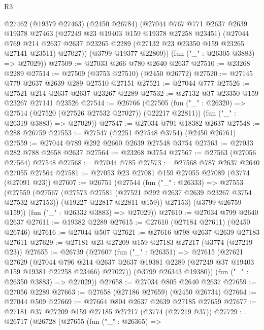 \begin{lexlean}{R3}
\begin{coremodule}
      @27462
        (@19379 @27463)
        (@2450 @26784)
        (@27044
          @767
          @771
          @2637
          @2639
          @19378
          @27463
          (@27249 @23 @19403 @159 @19378 @27258 @23451)
          (@27044
            @769
            @214
            @2637
            @2637
            @23265
            @2289
            (@27132 @23 @23350 @159 @23265 @27141 @23511)
            @27027))
        (@3799 @19377 @22809))
      (fun ("_" : @26305 @3883) => @27029))
@27509 := @27033 @266 @780 @2640 @2637
@27510 := @23268 @2289
@27514 := @27509 (@3753 @27510) (@2450 @26772)
@27520 := @27145 @779 @2637 @2639 @289 @27510 @27151
@27521 := @27044 @777
@27526 := @27521 @214 @2637 @2637 @23267 @2289
@27532 := @27132 @37 @23350 @159 @23267 @27141 @23526
@27544 := @26766
    (@27505
      (fun ("_" : @26320) => @27514 (@27520 (@27526 @27532 @27027)) (@22217 @22811))
      (fun ("_" : @26319 @3883) => @27029))
@27547 := @27034 @791 @18382 @2637
@27548 := @288 @26759
@27553 := @27547 (@2251 @27548 @3754) (@2450 @26761)
@27559 := @27044 @789 @292 @2660 @2639 @27548 @3754
@27563 := @27033 @282 @788 @2658 @2637
@27564 := @23268 @3754
@27567 := @27563 (@27056 @27564) @27548
@27568 := @27044 @785
@27573 := @27568 @787 @2637 @2640 @27055 @27564
@27581 := @27053 @23 @27081 @159 @27055 @27089 (@3774 (@27091 @23))
@27607 := @26751
    (@27544
      (fun ("_" : @26333) =>
      @27553
        (@27559
          (@27567
            (@27573 @27581 (@27521 @292 @2637 @2639 @23267 @3754 @27532 @27153))
            (@19227 @22817 @22811 @159))
          @27153)
        (@3799 @26759 @159))
      (fun ("_" : @26332 @3883) => @27029))
@27610 := @27034 @799 @2640 @2637
@27611 := @19382 @2289
@27615 := @27610 (@27184 @27611) (@2450 @26746)
@27616 := @27044 @507
@27621 := @27616 @798 @2637 @2639 @27183 @27611
@27629 := @27181 @23 @27209 @159 @27183 @27217 (@3774 (@27219 @23))
@27655 := @26739
    (@27607
      (fun ("_" : @26351) =>
      @27615
        (@27621
          @27629
          (@27044
            @796
            @214
            @2637
            @2637
            @19381
            @2289
            (@27249 @37 @19403 @159 @19381 @27258 @23466)
            @27027))
        (@3799 @26343 @19380))
      (fun ("_" : @26350 @3883) => @27029))
@27658 := @27034 @805 @2640 @2637
@27659 := @27056 @2289
@27663 := @27658 (@27186 @27659) (@2450 @26734)
@27664 := @27044 @509
@27669 := @27664 @804 @2637 @2639 @27185 @27659
@27677 := @27181 @37 @27209 @159 @27185 @27217 (@3774 (@27219 @37))
@27729 := @26717
    (@26728
      (@27655
        (fun ("_" : @26365) =>

\end{coremodule}
\end{lexlean}
